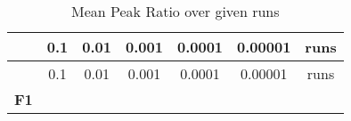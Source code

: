 \documentclass[12pt,a4paper]{article}
\begin{document}
\begin{longtable}[c]{@{}ccccccc@{}}
\caption{Mean Peak Ratio over given runs}\tabularnewline
\toprule
\begin{minipage}[b]{0.11\columnwidth}\centering\strut
~
\strut\end{minipage} &
\begin{minipage}[b]{0.09\columnwidth}\centering\strut
0.1
\strut\end{minipage} &
\begin{minipage}[b]{0.08\columnwidth}\centering\strut
0.01
\strut\end{minipage} &
\begin{minipage}[b]{0.09\columnwidth}\centering\strut
0.001
\strut\end{minipage} &
\begin{minipage}[b]{0.10\columnwidth}\centering\strut
0.0001
\strut\end{minipage} &
\begin{minipage}[b]{0.11\columnwidth}\centering\strut
0.00001
\strut\end{minipage} &
\begin{minipage}[b]{0.07\columnwidth}\centering\strut
runs
\strut\end{minipage}\tabularnewline
\midrule
\endfirsthead
\toprule
\begin{minipage}[b]{0.11\columnwidth}\centering\strut
~
\strut\end{minipage} &
\begin{minipage}[b]{0.09\columnwidth}\centering\strut
0.1
\strut\end{minipage} &
\begin{minipage}[b]{0.08\columnwidth}\centering\strut
0.01
\strut\end{minipage} &
\begin{minipage}[b]{0.09\columnwidth}\centering\strut
0.001
\strut\end{minipage} &
\begin{minipage}[b]{0.10\columnwidth}\centering\strut
0.0001
\strut\end{minipage} &
\begin{minipage}[b]{0.11\columnwidth}\centering\strut
0.00001
\strut\end{minipage} &
\begin{minipage}[b]{0.07\columnwidth}\centering\strut
runs
\strut\end{minipage}\tabularnewline
\midrule
\endhead
\begin{minipage}[t]{0.11\columnwidth}\centering\strut
\textbf{F1}
\strut\end{minipage} &

\end{longtable}
\end{document}
